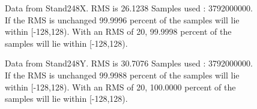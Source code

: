 \begin{figure}[ht] 				 				 				\caption{Data from Stand248X. RMS is 26.1238 Samples used : 3792000000. If the RMS is unchanged 99.9996 percent of the samples will lie within [-128,128).  				 With an RMS of 20, 99.9998 percent of the samples will lie within [-128,128).} 				\end{figure} 

\begin{figure}[ht] 				 				 				\caption{Data from Stand248Y. RMS is 30.7076 Samples used : 3792000000. If the RMS is unchanged 99.9988 percent of the samples will lie within [-128,128).  				 With an RMS of 20, 100.0000 percent of the samples will lie within [-128,128).} 				\end{figure} 

